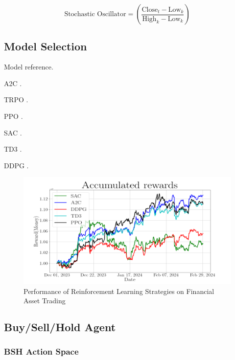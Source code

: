 \documentclass[journal]{new-aiaa}
\begin{document}
\begin{equation}
        \text{Stochastic Oscillator} = \left(\frac{\text{Close}_{t} - \text{Low}_{k}}{\text{High}_{k} - \text{Low}_{k}}\right)
\end{equation}

\subsection{Model Selection}\label{sec:Model_Design:Model_Selection}

Model reference. \cite{RLinFinance}

A2C \cite{mnih2016asynchronousmethodsdeepreinforcement}.

TRPO \cite{schulman2017trustregionpolicyoptimization}.

PPO \cite{schulman2017proximalpolicyoptimizationalgorithms}.

SAC \cite{haarnoja2019softactorcriticalgorithmsapplications}.

TD3 \cite{fujimoto2018addressingfunctionapproximationerror}.

DDPG \cite{lillicrap2019continuouscontroldeepreinforcement}.

\begin{figure}[hbt!]
        \centering
        \includegraphics[width=.6\textwidth]{figures/Accumulated_Rewards_Reference.png}
        \caption{Performance of Reinforcement Learning Strategies on Financial Asset Trading \cite{RLinFinance}}
        \label{fig:Accumulated_Rewards_Reference}
\end{figure}

\subsection{Buy/Sell/Hold Agent}\label{sec:Model_Design:Buy_Sell_Hold_Agent}

\subsubsection{BSH Action Space}\label{sec:Model_Design:Buy_Sell_Hold_Agent:BSH_Action_Space}
\end{document}
